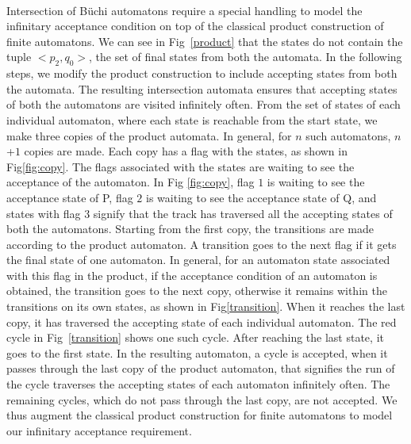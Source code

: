 ~\\
\noindent
Intersection of B\"{u}chi automatons require a special handling to model the infinitary acceptance condition on top of the classical product construction of finite automatons. We can see in Fig~\ref{product} that the states do not contain the tuple $<p_2,q_0>$, the set of final states
 from both the automata. In
 the following steps, we modify the product construction to include accepting states from
 both the automata. The resulting intersection automata ensures that accepting states of both the automatons are visited  infinitely often. From the set of states of each individual automaton, where each state is reachable from the 
 start state, we make three copies of the product automata. In general, for $n$ such automatons, $n$+$1$ copies are made.
 Each copy has a flag with the states, as shown in Fig\ref{fig:copy}. The flags associated with 
 the states are waiting to see the acceptance of the automaton.
In Fig \ref{fig:copy}, flag $1$ is waiting to see the acceptance state of P, flag $2$ is waiting to see
the acceptance state of Q, and states with flag $3$ signify that the track has traversed all the accepting states
of both the automatons. Starting from the first copy, the transitions are made according to the product automaton.
 A transition goes to the next flag if it gets the final state of one automaton. In general, for an automaton state associated with this flag in the product, if the acceptance condition of an automaton is obtained, the transition goes to the next copy, otherwise it remains within the transitions on its own states, as shown in  Fig\ref{transition}. When it reaches the last copy, it has traversed the accepting state of
 each individual automaton. The red cycle in Fig~\ref{transition} shows one such cycle. After reaching the last state, it goes to the first state. In the resulting automaton, a cycle is accepted, when it passes through the last copy
 of the product automaton, that signifies the run of the cycle traverses the accepting states of each automaton infinitely often. The remaining cycles, which do not pass through the last copy, are not accepted. We thus augment the classical product construction for finite automatons to model our infinitary acceptance requirement.
 
